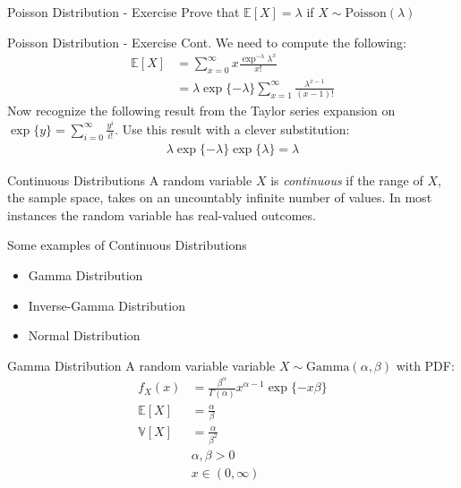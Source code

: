 \documentclass{beamer}
\begin{document}
\begin{frame}{Poisson Distribution - Exercise}
Prove that $\mathbb{E}[X] = \lambda$ if $X\sim\mathrm{Poisson}(\lambda)$
\end{frame}

\begin{frame}{Poisson Distribution - Exercise Cont.}
We need to compute the following:
\begin{align*}
\mathbb{E}[X] &= \sum_{x = 0}^{\infty}x \frac{\exp^{-\lambda}\lambda^{x}}{x!} \\
&= \lambda \exp\{-\lambda\} \sum_{x = 1}^{\infty}\frac{\lambda^{x-1}}{(x-1)!} 
\end{align*}
Now recognize the following result from the Taylor series expansion on $\exp\{y\} = \sum_{i=0}^{\infty}\frac{y^{i}}{i!}$. Use this result with a clever substitution:
\begin{align*}
\lambda \exp\{-\lambda\} \exp\{\lambda\} = \lambda
\end{align*}
\end{frame}



\begin{frame}{Continuous Distributions}
A random variable $X$ is \emph{continuous} if the range of $X$, the sample space, takes on an uncountably infinite number of values. In most instances the random variable has real-valued outcomes. 
\newline

Some examples of Continuous Distributions
\begin{itemize}
\item{Gamma Distribution}
\item{Inverse-Gamma Distribution}
\item{Normal Distribution}
\end{itemize}
\end{frame}

\begin{frame}{Gamma Distribution}
A random variable variable $X\sim\mathrm{Gamma}(\alpha, \beta)$ with PDF:
\begin{align*}
f_{X}(x) &= \frac{\beta^{\alpha}}{\Gamma(\alpha)}x^{\alpha-1}\exp\{-x\beta\} \\
\mathbb{E}[X] &= \frac{\alpha}{\beta} \\
\mathbb{V}[X] &= \frac{\alpha}{\beta^{2}} \\
&\alpha, \beta > 0 \\
&x \in (0, \infty)
\end{align*} 
\end{frame}
\end{document}
